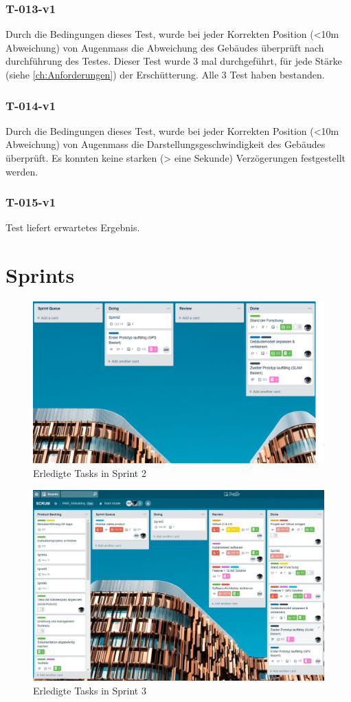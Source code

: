 \documentclass[a4paper]{scrreprt}
\begin{document}
\subsection*{T-013-v1}
Durch die Bedingungen dieses Test, wurde bei jeder Korrekten Position (<10m Abweichung) von Augenmass die Abweichung des Gebäudes überprüft nach durchführung des Testes.
Dieser Test wurde 3 mal durchgeführt, für jede Stärke (siehe \ref{ch:Anforderungen}) der Erschütterung.
Alle 3 Test haben bestanden.
\subsection*{T-014-v1}
Durch die Bedingungen dieses Test, wurde bei jeder Korrekten Position (<10m Abweichung) von Augenmass die Darstellungsgeschwindigkeit des Gebäudes überprüft. Es konnten keine starken (> eine Sekunde) Verzögerungen festgestellt werden.
\subsection*{T-015-v1}
Test liefert erwartetes Ergebnis.
\chapter*{Sprints}

\begin{figure}[h!]
	\includegraphics[keepaspectratio,width=\textwidth]{SprintReview_2}
	\caption*{Erledigte Tasks in Sprint 2}
\end{figure}

\begin{figure}[h!]
	\includegraphics[keepaspectratio,width=\textwidth]{SprintReview_3}
	\caption*{Erledigte Tasks in Sprint 3}
\end{figure}
\end{document}
